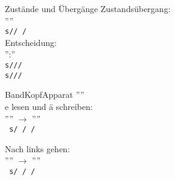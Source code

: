 \documentclass[aspectratio=169,usenames,dvipsnames]{beamer}
\begin{document}
\begin{frame}{ Zust\"ande und \"Uberg\"ange }
	Zustands\"ubergang:\\
	\hspace{12em}
	''''\\\pause
	\bigskip	
	\hspace{15em}
	\texttt{s//%
	/}\\
	\pause\pause
	\bigskip
	Entscheidung:\\
	\hspace{12em}
	'':''\\\pause
	\bigskip
	\hspace{15em}
	\texttt{s///}\\
	\hspace{15em}
	\texttt{s///}
\end{frame}

\begin{frame}{BandKopfApparat}
	\hspace{8em}
	''''\\\pause
	\bigskip
	e lesen und \"a schreiben:\\
	\hspace{15em}
	''\only<5->\only<3->\only<4->\only<5->''
	$\rightarrow$
	''\only<5->\only<3->\only<4->\only<5->''
	\\
	\hspace{15em}
	\texttt{%
		s/%
		\visible<5->{\cA{\sedunder{\bsl1}{(.*)}}}%
		\visible<4->{\cB{e}}%
		\visible<5->{\cA{\sedunder{\bsl2}{(.*)}}}/%
	\visible<5->{\cA{\bsl1}}%
	\visible<4->{\cB{\"a}}%
	/}
	\\\pause\pause\pause\pause

	Nach links gehen:\\
	\hspace{15em}
	''\only<9->\only<8->\only<7->\only<9->''
	$\rightarrow$
	''\only<9->\only<7->\only<8->\only<9->''
	\\
	\hspace{15em}
	\texttt{%
		s/\visible<9->{\cA{\sedunder{\bsl1}{(.*)}}}%
		\visible<7->{\cD{@}}%
		\visible<9->{\cA{\sedunder{\bsl3}{(.*)}}}/%
	/}
\end{frame}
\end{document}

